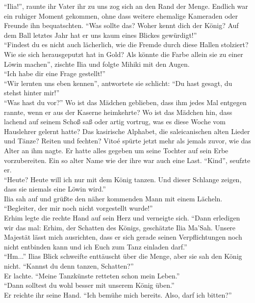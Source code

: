 ``Ilia!'', raunte ihr Vater ihr zu uns zog sich an den Rand der Menge. Endlich war ein ruhiger 
Moment gekommen, ohne dass weitere ehemalige Kameraden oder Freunde ihn bequatschten. ``Was sollte 
das? Woher kennt dich der König? Auf dem Ball letztes Jahr hat er uns kaum eines Blickes 
gewürdigt!''\\
``Findest du es nicht auch lächerlich, wie die Fremde durch diese Hallen stolziert? Wie sie sich 
herausgeputzt hat in Gold? Als könnte die Farbe allein sie zu einer Löwin machen'', zischte Ilia 
und folgte Mihiki mit den Augen.\\
``Ich habe dir eine Frage gestellt!''\\
``Wir lernten uns eben kennen'', antwortete sie schlicht: ``Du hast gesagt, du stehst hinter 
mir!''\\
``Was hast du vor?'' Wo ist das Mädchen geblieben, dass ihm jedes Mal entgegen rannte, wenn er aus 
der Kaserne heimkehrte? Wo ist das Mädchen hin, dass lachend auf seinem Schoß saß oder artig 
vortrug, was es diese Woche vom Hauslehrer gelernt hatte? Das kasirische Alphabet, die 
saleicanischen alten Lieder und Tänze? Reiten und fechten? Vitoé spürte jetzt mehr als jemals 
zuvor, wie das Alter an ihm nagte. Er hatte alles gegeben um seine Tochter auf sein Erbe 
vorzubereiten. Ein so alter Name wie der ihre war auch eine Last. ``Kind'', seufzte er.\\
``Heute? Heute will ich nur mit dem König tanzen. Und dieser Schlange zeigen, dass sie niemals eine 
Löwin wird.''\\
Ilia sah auf und grüßte den näher kommenden Mann mit einem Lächeln. ``Begleiter, der mir noch nicht 
vorgestellt wurde!''\\
Erhim legte die rechte Hand auf sein Herz und verneigte sich. ``Dann erledigen wir das 
mal: Erhim, der Schatten des Königs, geschätzte Ilia Ma'Sah. Unsere Majestät lässt mich ausrichten, 
dass er sich gerade seinen Verpflichtungen noch nicht entbinden kann und ich Euch zum Tanz einladen 
darf.''\\
``Hm...'' Ilias Blick schweifte enttäuscht über die Menge, aber sie sah den König nicht. ``Kannst 
du denn tanzen, Schatten?''\\
Er lachte. ``Meine Tanzkünste retteten schon mein Leben.''\\
``Dann solltest du wohl besser mit unserem König üben.''\\
Er reichte ihr seine Hand. ``Ich bemühe mich bereits. Also, darf ich bitten?''\\

